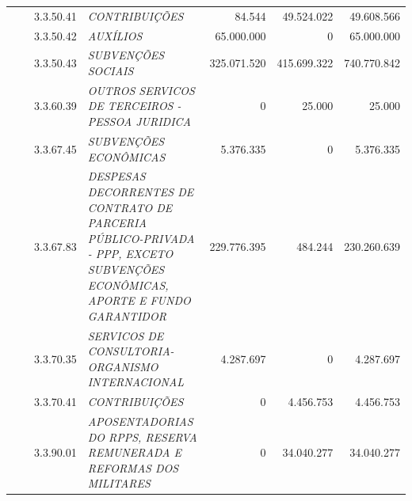\documentclass{article}
\begin{document}
\begin{longtable}[c]{m{0.1cm}m{0.1cm}m{0.8cm}|m{8cm}|m{2cm}|m{2cm}|m{2cm}}
\multicolumn{1}{l}{} & \multicolumn{1}{l}{} & \multicolumn{1}{l|}{3.3.50.41} & \multicolumn{1}{L{8cm}|}{\textit{CONTRIBUIÇÕES}} & \multicolumn{1}{r|}{84.544} & \multicolumn{1}{r|}{49.524.022} &  \multicolumn{1}{r}{49.608.566}\\
\multicolumn{1}{l}{} & \multicolumn{1}{l}{} & \multicolumn{1}{l|}{3.3.50.42} & \multicolumn{1}{L{8cm}|}{\textit{AUXÍLIOS}} & \multicolumn{1}{r|}{65.000.000} & \multicolumn{1}{r|}{             0} &  \multicolumn{1}{r}{65.000.000}\\
\multicolumn{1}{l}{} & \multicolumn{1}{l}{} & \multicolumn{1}{l|}{3.3.50.43} & \multicolumn{1}{L{8cm}|}{\textit{SUBVENÇÕES SOCIAIS}} & \multicolumn{1}{r|}{325.071.520} & \multicolumn{1}{r|}{415.699.322} &  \multicolumn{1}{r}{740.770.842}\\
\multicolumn{1}{l}{} & \multicolumn{1}{l}{} & \multicolumn{1}{l|}{3.3.60.39} & \multicolumn{1}{L{8cm}|}{\textit{OUTROS SERVICOS DE TERCEIROS - PESSOA JURIDICA}} & \multicolumn{1}{r|}{             0} & \multicolumn{1}{r|}{25.000} &  \multicolumn{1}{r}{25.000}\\
\multicolumn{1}{l}{} & \multicolumn{1}{l}{} & \multicolumn{1}{l|}{3.3.67.45} & \multicolumn{1}{L{8cm}|}{\textit{SUBVENÇÕES ECONÔMICAS}} & \multicolumn{1}{r|}{5.376.335} & \multicolumn{1}{r|}{             0} &  \multicolumn{1}{r}{5.376.335}\\
\multicolumn{1}{l}{} & \multicolumn{1}{l}{} & \multicolumn{1}{l|}{3.3.67.83} & \multicolumn{1}{L{8cm}|}{\textit{DESPESAS DECORRENTES DE CONTRATO DE PARCERIA PÚBLICO-PRIVADA - PPP, EXCETO SUBVENÇÕES ECONÔMICAS, APORTE E FUNDO GARANTIDOR}} & \multicolumn{1}{r|}{229.776.395} & \multicolumn{1}{r|}{484.244} &  \multicolumn{1}{r}{230.260.639}\\
\multicolumn{1}{l}{} & \multicolumn{1}{l}{} & \multicolumn{1}{l|}{3.3.70.35} & \multicolumn{1}{L{8cm}|}{\textit{SERVICOS DE CONSULTORIA-ORGANISMO INTERNACIONAL}} & \multicolumn{1}{r|}{4.287.697} & \multicolumn{1}{r|}{             0} &  \multicolumn{1}{r}{4.287.697}\\
\multicolumn{1}{l}{} & \multicolumn{1}{l}{} & \multicolumn{1}{l|}{3.3.70.41} & \multicolumn{1}{L{8cm}|}{\textit{CONTRIBUIÇÕES}} & \multicolumn{1}{r|}{             0} & \multicolumn{1}{r|}{4.456.753} &  \multicolumn{1}{r}{4.456.753}\\
\multicolumn{1}{l}{} & \multicolumn{1}{l}{} & \multicolumn{1}{l|}{3.3.90.01} & \multicolumn{1}{L{8cm}|}{\textit{APOSENTADORIAS DO RPPS, RESERVA REMUNERADA E REFORMAS DOS MILITARES}} & \multicolumn{1}{r|}{             0} & \multicolumn{1}{r|}{34.040.277} &  \multicolumn{1}{r}{34.040.277}\\

\end{longtable}
\end{document}
